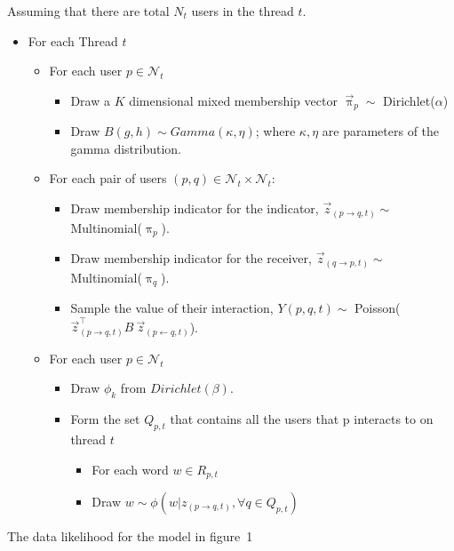 Assuming that there are total $N_t$ users in the thread $t$.  
\begin{itemize}
  \item For each Thread $t$
\begin{itemize}
  \item For each user $p \in \mathcal{N}_t$
  \begin{itemize}
    \item Draw a $K$ dimensional mixed membership vector 
    $\overset{\rightarrow}{\uppi}_{p} \sim$ Dirichlet($\alpha$)

    \item Draw $B(g,h) \sim Gamma(\kappa,\eta)$; where $\kappa, \eta$ are
    parameters of the gamma distribution.
  \end{itemize}

  \item For each pair of users $(p, q) \in \mathcal{N}_t \times \mathcal{N}_t$:
  \begin{itemize}
    \item Draw membership indicator for the indicator, 
    $\overset{\rightarrow}{z}_{(p \rightarrow q,t)} \sim$
    Multinomial($\uppi_{p}$).
    \item Draw membership indicator for the receiver,
    $\overset{\rightarrow}{z}_{(q \rightarrow p,t)} \sim$
    Multinomial($\uppi_{q}$).
    \item Sample the value of their interaction, $Y(p,q,t) \sim$
    Poisson(${\overset{\rightarrow}{z}}^{\top}_{(p \rightarrow q,t)}
    B~\overset{\rightarrow}{z}_{(p \leftarrow q,t)}$). 
	\end{itemize}
	\item For each user $p \in \mathcal{N}_t$
	\begin{itemize}
	  \item Draw $\phi_{k}$ from $Dirichlet(\beta)$.
	  \item Form the set $Q_{p,t}$ that contains all the users that p interacts to
	  on thread $t$
	  \begin{itemize}
	    \item For each word $w \in R_{p,t}$ 
	    \item Draw $w \sim \phi(w|z_{(p \rightarrow q,t)}, \forall q\in Q_{p,t})$  
	  \end{itemize}
  \end{itemize}
\end{itemize}  
\end{itemize}

The data likelihood for the model in figure~1

